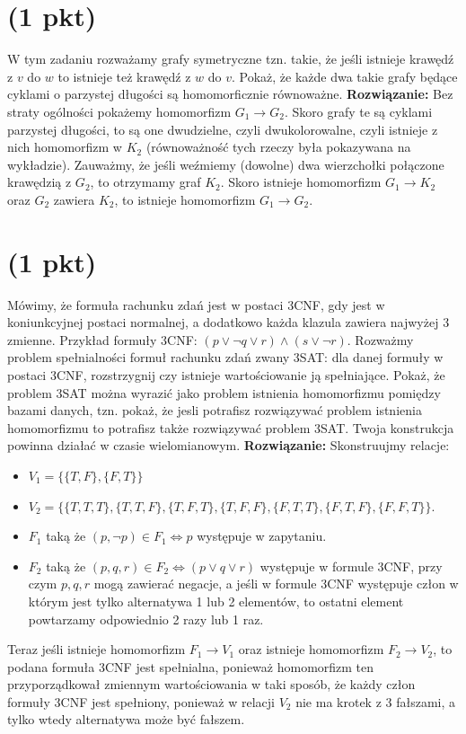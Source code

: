 \documentclass{article}
\begin{document}
\section{(1 pkt)}
W tym zadaniu rozważamy grafy symetryczne tzn. takie, że jeśli istnieje krawędź z $v$ do $w$ to istnieje też krawędź z $w$ do $v$. Pokaż, że każde dwa takie grafy będące cyklami o parzystej długości są homomorficznie równoważne.
\newline \textbf{Rozwiązanie:} Bez straty ogólności pokażemy homomorfizm $G_1 \rightarrow G_2$. Skoro grafy te są cyklami parzystej długości, to są one dwudzielne, czyli dwukolorowalne, czyli istnieje z nich homomorfizm w $K_2$ (równoważność tych rzeczy była pokazywana na wykładzie). Zauważmy, że jeśli weźmiemy (dowolne) dwa wierzchołki połączone krawędzią z $G_2$, to otrzymamy graf $K_2$. Skoro istnieje homomorfizm $G_1 \rightarrow K_2$ oraz $G_2$ zawiera $K_2$, to istnieje homomorfizm $G_1 \rightarrow G_2$.

\section{(1 pkt)}
Mówimy, że formuła rachunku zdań jest w postaci 3CNF, gdy jest w koniunkcyjnej postaci normalnej, a dodatkowo każda klazula zawiera najwyżej 3 zmienne. Przykład formuły 3CNF: $(p \vee \neg q \vee r) \wedge (s \vee \neg r)$.
Rozważmy problem spełnialności formuł rachunku zdań zwany 3SAT: dla danej formuły w postaci 3CNF, rozstrzygnij czy istnieje wartościowanie ją spełniające.
Pokaż, że problem 3SAT można wyrazić jako problem istnienia homomorfizmu pomiędzy bazami danych, tzn. pokaż, że jesli potrafisz rozwiązywać problem istnienia homomorfizmu to potrafisz także rozwiązywać problem 3SAT. Twoja konstrukcja powinna działać w czasie wielomianowym.
\newline \textbf{Rozwiązanie:}
Skonstruujmy relacje:
\begin{itemize}
        \item $V_1 = \{\{T, F\}, \{F, T\}\}$
        \item $V_2 = \{ 
                \{ T, T, T \},
                \{ T, T, F \},
                \{ T, F, T \},
                \{ T, F, F \},
                \{ F, T, T \},
                \{ F, T, F \},
                \{ F, F, T \}
                \}$.
        \item $F_1$ taką że $(p, \neg p) \in F_1 \iff p$ występuje w zapytaniu.
        \item $F_2$ taką że $(p, q, r) \in F_2 \iff (p \vee q \vee r)$ występuje w formule 3CNF, przy czym $p, q, r$ mogą zawierać negacje, a jeśli w formule 3CNF występuje człon w którym jest tylko alternatywa 1 lub 2 elementów, to ostatni element powtarzamy odpowiednio 2 razy lub 1 raz.
\end{itemize}
Teraz jeśli istnieje homomorfizm $F_1 \rightarrow V_1$ oraz istnieje homomorfizm $F_2 \rightarrow V_2$, to podana formuła 3CNF jest spełnialna, ponieważ homomorfizm ten przyporządkował zmiennym wartościowania w taki sposób, że każdy człon formuły 3CNF jest spełniony, ponieważ w relacji $V_2$ nie ma krotek z 3 fałszami, a tylko wtedy alternatywa może być fałszem.
\end{document}
